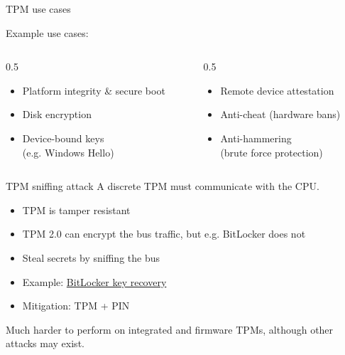 \begin{frame}{TPM use cases}


  Example use cases:
  \begin{columns}[T,onlytextwidth]
    \begin{column}{0.5\textwidth}
      \begin{itemize}[<+(1)->]
        \item Platform integrity \& secure boot
        \item Disk encryption
        \item Device-bound keys\\(e.g. Windows Hello)
      \end{itemize}
    \end{column}
    \begin{column}{0.5\textwidth}
      \begin{itemize}[<+(1)->]
        \item Remote device attestation
        \item Anti-cheat (hardware bans)
        \item Anti-hammering\\(brute force protection)
      \end{itemize}
    \end{column}
  \end{columns}
\end{frame}

\begin{frame}{TPM sniffing attack}
  A discrete TPM must communicate with the CPU.
  \begin{itemize}[<+(1)->]
    \item TPM is tamper resistant
    \item TPM 2.0 can encrypt the bus traffic, but e.g. BitLocker does not
    \item Steal secrets by sniffing the bus
    \item Example: \href{https://pulsesecurity.co.nz/articles/TPM-sniffing}{BitLocker key recovery}
    \item Mitigation: TPM + PIN
  \end{itemize}

  \vspace*{1em}

  \pause
  Much harder to perform on integrated and firmware TPMs, although other attacks may exist.
\end{frame}

